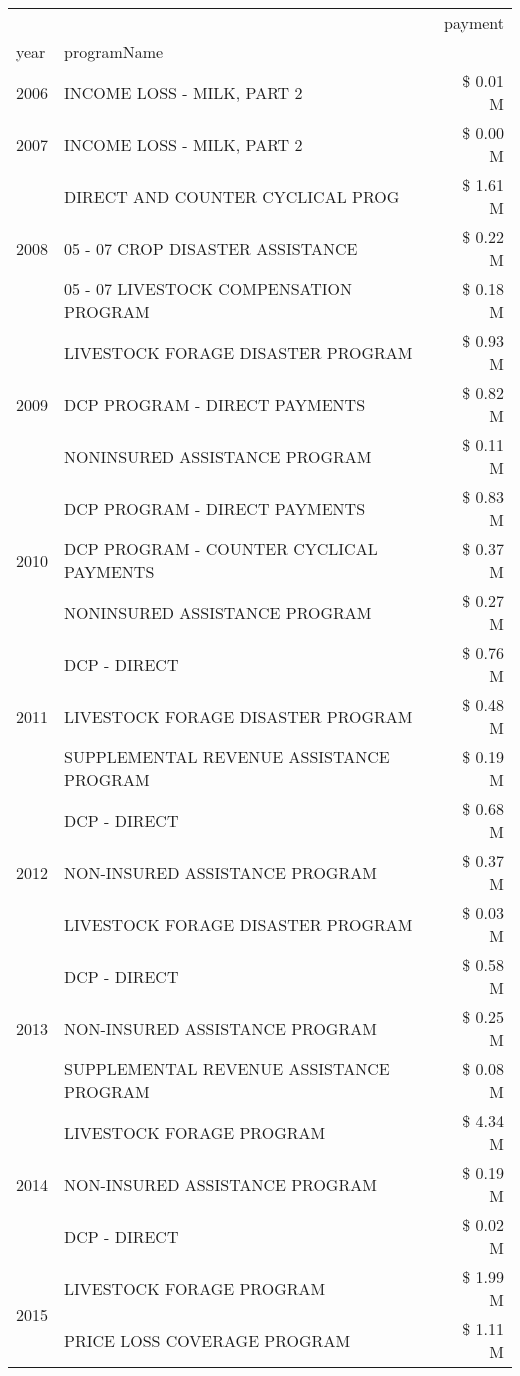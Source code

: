 \begin{tabular}{llr}
\toprule
 &  & payment \\
year & programName &  \\
\midrule
2006 & INCOME LOSS - MILK, PART 2 & \$ 0.01 M \\
\cline{1-3}
2007 & INCOME LOSS - MILK, PART 2 & \$ 0.00 M \\
\cline{1-3}
\multirow[t]{3}{*}{2008} & DIRECT AND COUNTER CYCLICAL PROG & \$ 1.61 M \\
 & 05 - 07 CROP DISASTER ASSISTANCE & \$ 0.22 M \\
 & 05 - 07 LIVESTOCK COMPENSATION PROGRAM & \$ 0.18 M \\
\cline{1-3}
\multirow[t]{3}{*}{2009} & LIVESTOCK FORAGE DISASTER  PROGRAM & \$ 0.93 M \\
 & DCP PROGRAM - DIRECT PAYMENTS & \$ 0.82 M \\
 & NONINSURED ASSISTANCE PROGRAM & \$ 0.11 M \\
\cline{1-3}
\multirow[t]{3}{*}{2010} & DCP PROGRAM - DIRECT PAYMENTS & \$ 0.83 M \\
 & DCP PROGRAM - COUNTER CYCLICAL PAYMENTS & \$ 0.37 M \\
 & NONINSURED ASSISTANCE PROGRAM & \$ 0.27 M \\
\cline{1-3}
\multirow[t]{3}{*}{2011} & DCP - DIRECT & \$ 0.76 M \\
 & LIVESTOCK FORAGE DISASTER PROGRAM & \$ 0.48 M \\
 & SUPPLEMENTAL REVENUE ASSISTANCE PROGRAM & \$ 0.19 M \\
\cline{1-3}
\multirow[t]{3}{*}{2012} & DCP - DIRECT & \$ 0.68 M \\
 & NON-INSURED ASSISTANCE PROGRAM & \$ 0.37 M \\
 & LIVESTOCK FORAGE DISASTER PROGRAM & \$ 0.03 M \\
\cline{1-3}
\multirow[t]{3}{*}{2013} & DCP - DIRECT & \$ 0.58 M \\
 & NON-INSURED ASSISTANCE PROGRAM & \$ 0.25 M \\
 & SUPPLEMENTAL REVENUE ASSISTANCE PROGRAM & \$ 0.08 M \\
\cline{1-3}
\multirow[t]{3}{*}{2014} & LIVESTOCK FORAGE PROGRAM & \$ 4.34 M \\
 & NON-INSURED ASSISTANCE PROGRAM & \$ 0.19 M \\
 & DCP - DIRECT & \$ 0.02 M \\
\cline{1-3}
\multirow[t]{3}{*}{2015} & LIVESTOCK FORAGE PROGRAM & \$ 1.99 M \\
 & PRICE LOSS COVERAGE PROGRAM & \$ 1.11 M \\

\end{tabular}

